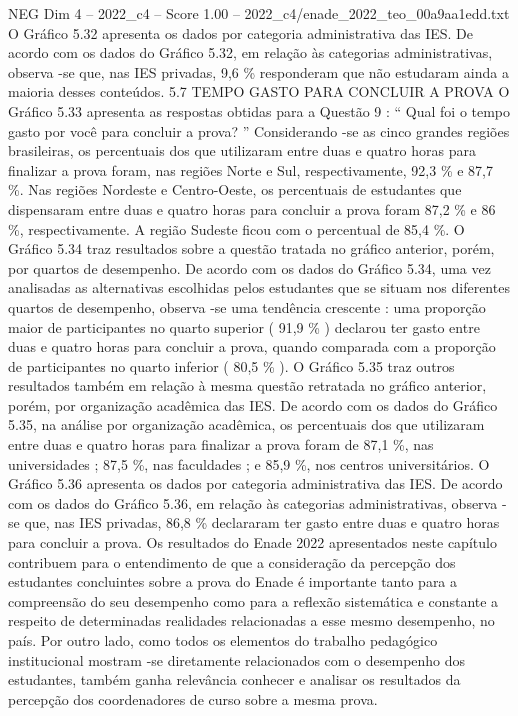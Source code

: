 \begin{textsample}{NEG Dim 4 – 2022\_c4 – Score 1.00 – 2022\_c4/enade\_2022\_teo\_00a9aa1edd.txt}
O Gráfico 5.32 apresenta os dados por categoria administrativa das IES.
De acordo com os dados do Gráfico 5.32, em relação às categorias administrativas, observa -se que, nas IES privadas, 9,6 \% responderam que não estudaram ainda a maioria desses conteúdos. 5.7 TEMPO GASTO PARA CONCLUIR A PROVA O Gráfico 5.33 apresenta as respostas obtidas para a Questão 9 : “ Qual foi o tempo gasto por você para concluir a prova? ” Considerando -se as cinco grandes regiões brasileiras, os percentuais dos que utilizaram entre duas e quatro horas para finalizar a prova foram, nas regiões Norte e Sul, respectivamente, 92,3 \% e 87,7 \%.
Nas regiões Nordeste e Centro-Oeste, os percentuais de estudantes que dispensaram entre duas e quatro horas para concluir a prova foram 87,2 \% e 86 \%, respectivamente.
A região Sudeste ficou com o percentual de 85,4 \%.
O Gráfico 5.34 traz resultados sobre a questão tratada no gráfico anterior, porém, por quartos de desempenho.
De acordo com os dados do Gráfico 5.34, uma vez analisadas as alternativas escolhidas pelos estudantes que se situam nos diferentes quartos de desempenho, observa -se uma tendência crescente : uma proporção maior de participantes no quarto superior ( 91,9 \% ) declarou ter gasto entre duas e quatro horas para concluir a prova, quando comparada com a proporção de participantes no quarto inferior ( 80,5 \% ).
O Gráfico 5.35 traz outros resultados também em relação à mesma questão retratada no gráfico anterior, porém, por organização acadêmica das IES.
De acordo com os dados do Gráfico 5.35, na análise por organização acadêmica, os percentuais dos que utilizaram entre duas e quatro horas para finalizar a prova foram de 87,1 \%, nas universidades ; 87,5 \%, nas faculdades ; e 85,9 \%, nos centros universitários.
O Gráfico 5.36 apresenta os dados por categoria administrativa das IES.
De acordo com os dados do Gráfico 5.36, em relação às categorias administrativas, observa -se que, nas IES privadas, 86,8 \% declararam ter gasto entre duas e quatro horas para concluir a prova.
Os resultados do Enade 2022 apresentados neste capítulo contribuem para o entendimento de que a consideração da percepção dos estudantes concluintes sobre a prova do Enade é importante tanto para a compreensão do seu desempenho como para a reflexão sistemática e constante a respeito de determinadas realidades relacionadas a esse mesmo desempenho, no país.
Por outro lado, como todos os elementos do trabalho pedagógico institucional mostram -se diretamente relacionados com o desempenho dos estudantes, também ganha relevância conhecer e analisar os resultados da percepção dos coordenadores de curso sobre a mesma prova.

\end{textsample}
